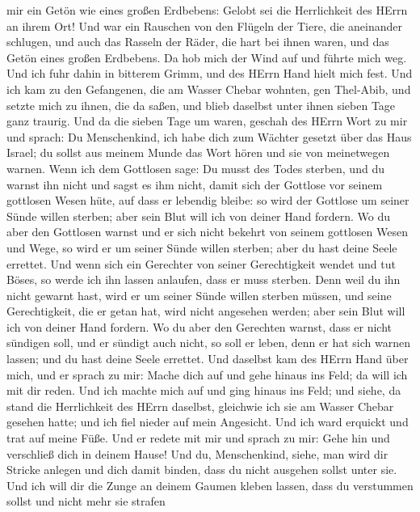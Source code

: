 mir ein Getön wie eines großen Erdbebens: Gelobt sei die Herrlichkeit
des HErrn an ihrem Ort!  Und war ein Rauschen von den
Flügeln der Tiere, die aneinander schlugen, und auch das Rasseln der
Räder, die hart bei ihnen waren, und das Getön eines großen Erdbebens.
 Da hob mich der Wind auf und führte mich weg. Und ich fuhr
dahin in bitterem Grimm, und des HErrn Hand hielt mich fest.
 Und ich kam zu den Gefangenen, die am Wasser Chebar
wohnten, gen Thel-Abib, und setzte mich zu ihnen, die da saßen, und
blieb daselbst unter ihnen sieben Tage ganz traurig.  Und
da die sieben Tage um waren, geschah des HErrn Wort zu mir und sprach:
 Du Menschenkind, ich habe dich zum Wächter gesetzt über
das Haus Israel; du sollst aus meinem Munde das Wort hören und sie von
meinetwegen warnen.  Wenn ich dem Gottlosen sage: Du musst
des Todes sterben, und du warnst ihn nicht und sagst es ihm nicht, damit
sich der Gottlose vor seinem gottlosen Wesen hüte, auf dass er lebendig
bleibe: so wird der Gottlose um seiner Sünde willen sterben; aber sein
Blut will ich von deiner Hand fordern.  Wo du aber den
Gottlosen warnst und er sich nicht bekehrt von seinem gottlosen Wesen
und Wege, so wird er um seiner Sünde willen sterben; aber du hast deine
Seele errettet.  Und wenn sich ein Gerechter von seiner
Gerechtigkeit wendet und tut Böses, so werde ich ihn lassen anlaufen,
dass er muss sterben. Denn weil du ihn nicht gewarnt hast, wird er um
seiner Sünde willen sterben müssen, und seine Gerechtigkeit, die er
getan hat, wird nicht angesehen werden; aber sein Blut will ich von
deiner Hand fordern.  Wo du aber den Gerechten warnst, dass
er nicht sündigen soll, und er sündigt auch nicht, so soll er leben,
denn er hat sich warnen lassen; und du hast deine Seele errettet.
 Und daselbst kam des HErrn Hand über mich, und er sprach
zu mir: Mache dich auf und gehe hinaus ins Feld; da will ich mit dir
reden.  Und ich machte mich auf und ging hinaus ins Feld;
und siehe, da stand die Herrlichkeit des HErrn daselbst, gleichwie ich
sie am Wasser Chebar gesehen hatte; und ich fiel nieder auf mein
Angesicht.  Und ich ward erquickt und trat auf meine Füße.
Und er redete mit mir und sprach zu mir: Gehe hin und verschließ dich in
deinem Hause!  Und du, Menschenkind, siehe, man wird dir
Stricke anlegen und dich damit binden, dass du nicht ausgehen sollst
unter sie.  Und ich will dir die Zunge an deinem Gaumen
kleben lassen, dass du verstummen sollst und nicht mehr sie strafen
